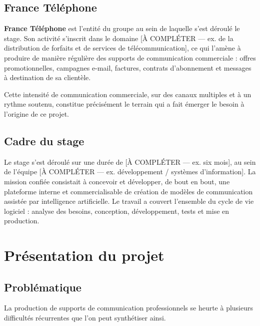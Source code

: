 \subsection{France Téléphone}
\textbf{France Téléphone} est l'entité du groupe au sein de laquelle s'est
déroulé le stage. Son activité s'inscrit dans le domaine
[À COMPLÉTER — ex. de la distribution de forfaits et de services de
télécommunication], ce qui l'amène à produire de manière régulière des
supports de communication commerciale : offres promotionnelles, campagnes
e-mail, factures, contrats d'abonnement et messages à destination de sa
clientèle.


Cette intensité de communication commerciale, sur des canaux multiples et
à un rythme soutenu, constitue précisément le terrain qui a fait émerger le
besoin à l'origine de ce projet.

\subsection{Cadre du stage}
Le stage s'est déroulé sur une durée de [À COMPLÉTER — ex. six mois], au
sein de l'équipe [À COMPLÉTER — ex. développement / systèmes
d'information]. La mission confiée consistait à concevoir et développer,
de bout en bout, une plateforme interne et commercialisable de création de
modèles de communication assistée par intelligence artificielle. Le travail
a couvert l'ensemble du cycle de vie logiciel : analyse des besoins,
conception, développement, tests et mise en production.

\section{Présentation du projet}

\subsection{Problématique}
La production de supports de communication professionnels se heurte à
plusieurs difficultés récurrentes que l'on peut synthétiser ainsi.

